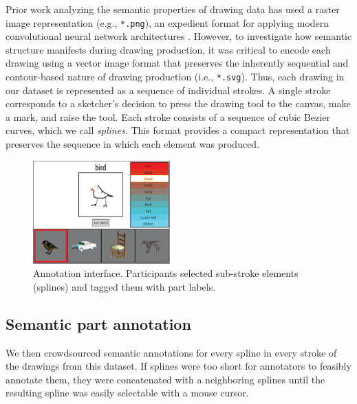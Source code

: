 \documentclass[10pt,letterpaper]{article}
\begin{document}
Prior work analyzing the semantic properties of drawing data has used a raster image representation (e.g., \texttt{*.png}), an expedient format for applying modern convolutional neural network architectures . 
However, to investigate how semantic structure manifests during drawing production, it was critical to encode each drawing using a vector image format that preserves the inherently sequential and contour-based nature of drawing production (i.e., \texttt{*.svg}). 
Thus, each drawing in our dataset is represented as a sequence of individual strokes. A single stroke corresponds to a sketcher's decision to press the drawing tool to the canvas, make a mark, and raise the tool. 
Each stroke consists of a sequence of cubic Bezier curves, which we call \textit{splines}. 
This format provides a compact representation that preserves the sequence in which each element was produced.

\begin{figure}[htbp]
\centering
\includegraphics[width=0.47\textwidth]{figures/4_annotation_interface.pdf}
\caption{Annotation interface. Participants selected sub-stroke elements (splines) and tagged them with part labels.} %
\label{annotation_interface}
\vspace{-1em}
\end{figure}

\subsection{Semantic part annotation}

We then crowdsourced semantic annotations for every spline in every stroke of the drawings from this dataset. 
If splines were too short for annotators to feasibly annotate them, they were concatenated with a neighboring splines until the resulting spline was easily selectable with a mouse cursor.
\end{document}
